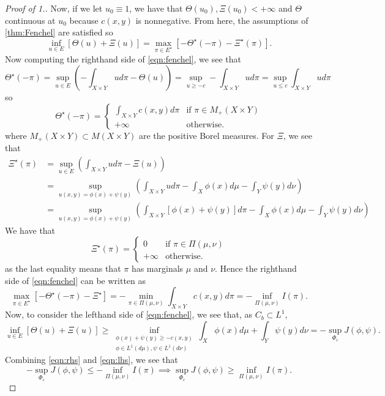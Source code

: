 \documentclass[12pt]{article}
\theoremstyle{plain}
\numberwithin{equation}{section}
\begin{document}
\begin{proof}[Proof of 1.]
Now, if we let $u_0\equiv 1$, we have that $\Theta(u_0),\Xi(u_0) < +\infty$ and $\Theta$ continuous at $u_0$ because $c(x,y)$ is nonnegative. 
From here, the assumptions of \autoref{thm:Fenchel} are satisfied so 
\begin{equation}\label{eqn:fenchel}
  \inf_{u\in E}[\Theta(u) + \Xi(u)] = \max_{\pi \in E^\star}[-\Theta^\star(-\pi) - \Xi^\star(\pi)].
\end{equation}
Now computing the righthand side of \autoref{eqn:fenchel}, we see that 
\[\Theta^\star(-\pi) = \sup_{u\in E}\left(-\int_{X\times Y}ud\pi - \Theta(u)\right) = \sup_{u \ge -c} -\int_{X\times Y}ud\pi = \sup_{u\le c}\int_{X\times Y}ud\pi\]
so \[\Theta^\star(-\pi) = \begin{cases}
  \int_{X\times Y} c(x,y)d\pi &\text{if } \pi\in M_+(X\times Y) \\
  +\infty &\text{otherwise.}
\end{cases}\]
where $M_+(X\times Y) \subset M(X\times Y)$ are the positive Borel measures. For $\Xi$, we see that 
\begin{align*}
  \Xi^\star(\pi) &= \sup_{u\in E}\left(\int_{X\times Y}ud\pi - \Xi(u)\right)\\
  & = \sup_{u(x,y) = \phi(x) + \psi(y)}\left(\int_{X\times Y}ud\pi - \int_X\phi(x)d\mu - \int_Y\psi(y)d\nu\right) \\
  &= \sup_{u(x,y) = \phi(x) + \psi(y)}\left(\int_{X\times Y}[\phi(x) + \psi(y)]d\pi - \int_X\phi(x)d\mu - \int_Y\psi(y)d\nu\right)
\end{align*}
We have that 
\[\Xi^\star(\pi) = \begin{cases}
  0 &\text{if }\pi\in\Pi(\mu,\nu) \\
  +\infty &\text{otherwise.}
\end{cases}\]
as the last equality means that $\pi$ has marginals $\mu$ and $\nu$.
Hence the righthand side of \autoref{eqn:fenchel} can be written as 
\begin{equation}\label{eqn:rhs}
  \max_{\pi\in E^\star}[-\Theta^\star(-\pi) - \Xi^\star] = -\min_{\pi\in \Pi(\mu,\nu)} \int_{X\times Y} c(x,y)d\pi = - \inf_{\Pi(\mu,\nu)}I(\pi).
\end{equation}
Now, to consider the lefthand side of \autoref{eqn:fenchel}, we see that, as $C_b\subset L^1$,
\begin{equation}\label{eqn:lhs}
  \inf_{u\in E} [\Theta(u) + \Xi(u)] \ge \inf_{\substack{\phi(x) + \psi(y) \ge -c(x,y)\\ \phi\in L^1(d\mu),\psi\in L^1(d\nu)}} \int_X\phi(x)d\mu + \int_Y\psi(y)d\nu = -\sup_{\Phi_c} J(\phi,\psi).
\end{equation}
Combining \autoref{eqn:rhs} and \autoref{eqn:lhs}, we see that 
\begin{equation}
  - \sup_{\Phi_c}J(\phi,\psi)\le - \inf_{\Pi(\mu,\nu)}I(\pi) \implies \sup_{\Phi_c}J(\phi,\psi)\ge \inf_{\Pi(\mu,\nu)}I(\pi).
\end{equation}
\end{proof}
\end{document}

